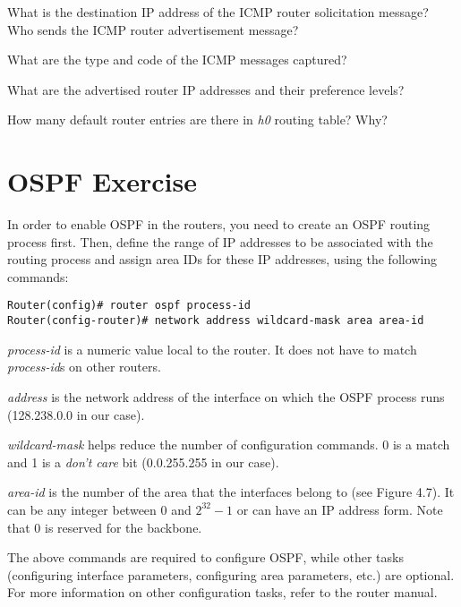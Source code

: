 \documentclass{../UTNetLab}
\begin{document}
    \begin{report}
        \item What is the destination IP address of the ICMP router solicitation message? Who sends the ICMP router advertisement message?
        \item What are the type and code of the ICMP messages captured?
        \item What are the advertised router IP addresses and their preference levels?
        \item How many default router entries are there in \textit{h0} routing table? Why?
    \end{report}

\part{OSPF Exercise}
    In order to enable OSPF in the routers, you need to create an OSPF routing process first.
    Then, define the range of IP addresses to be associated with the routing process and assign area IDs for these IP addresses, using the following commands:
    \begin{lstlisting}[language={cisco}, emph={process-id, area-id, address, wildcard-mask}]
Router(config)# router ospf process-id
Router(config-router)# network address wildcard-mask area area-id
    \end{lstlisting}
    
    \textit{process-id} is a numeric value local to the router.
    It does not have to match \textit{process-id}s on other routers.

    \textit{address} is the network address of the interface on which the OSPF process runs (128.238.0.0 in our case).

    \textit{wildcard-mask} helps reduce the number of configuration commands.
    0 is a match and 1 is a \textit{don’t care} bit (0.0.255.255 in our case).

    \textit{area-id} is the number of the area that the interfaces belong to (see Figure 4.7).
    It can be any integer between 0 and $2^{32} - 1$ or can have an IP address form.
    Note that 0 is reserved for the backbone. 

    The above commands are required to configure OSPF, while other tasks (configuring interface parameters, configuring area parameters, etc.) are optional.
    For more information on other configuration tasks, refer to the router manual. 
\end{document}
